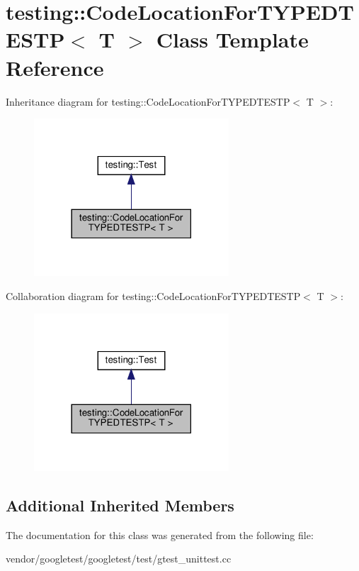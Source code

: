 \hypertarget{classtesting_1_1_code_location_for_t_y_p_e_d_t_e_s_t_p}{}\section{testing\+:\+:Code\+Location\+For\+T\+Y\+P\+E\+D\+T\+E\+S\+TP$<$ T $>$ Class Template Reference}
\label{classtesting_1_1_code_location_for_t_y_p_e_d_t_e_s_t_p}


Inheritance diagram for testing\+:\+:Code\+Location\+For\+T\+Y\+P\+E\+D\+T\+E\+S\+TP$<$ T $>$\+:
\nopagebreak
\begin{figure}[H]
\begin{center}
\leavevmode
\includegraphics[width=206pt]{classtesting_1_1_code_location_for_t_y_p_e_d_t_e_s_t_p__inherit__graph}
\end{center}
\end{figure}


Collaboration diagram for testing\+:\+:Code\+Location\+For\+T\+Y\+P\+E\+D\+T\+E\+S\+TP$<$ T $>$\+:
\nopagebreak
\begin{figure}[H]
\begin{center}
\leavevmode
\includegraphics[width=206pt]{classtesting_1_1_code_location_for_t_y_p_e_d_t_e_s_t_p__coll__graph}
\end{center}
\end{figure}
\subsection*{Additional Inherited Members}


The documentation for this class was generated from the following file\+:\begin{DoxyCompactItemize}
\item 
vendor/googletest/googletest/test/gtest\+\_\+unittest.\+cc\end{DoxyCompactItemize}
